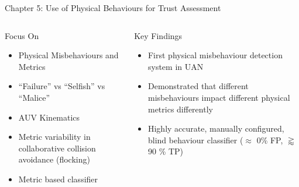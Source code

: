 \documentclass[aspectratio=43]{beamer}
\begin{document}
\begin{frame}{Chapter 5: Use of Physical Behaviours for Trust Assessment}
  \begin{columns}
    \begin{column}{0.5\textwidth}
      \begin{block}{Focus On}
        \begin{itemize}
          \item Physical Misbehaviours and Metrics
          \item ``Failure'' vs ``Selfish'' vs ``Malice''
          \item AUV Kinematics
          \item Metric variability in collaborative collision avoidance (flocking)
          \item Metric based classifier
        \end{itemize}
      \end{block}
    \end{column}
    \begin{column}{0.5\textwidth}
      \begin{exampleblock}{Key Findings}
        \begin{itemize}
        	\item First physical misbehaviour detection system in UAN
        	\item Demonstrated that different misbehaviours impact different physical metrics differently \hyperlink{fig:metric_values}{} \hyperlink{fig:summedsigmabar}{}
        	\item Highly accurate, manually configured, blind behaviour classifier ($\approx$ 0\% FP, $\gtrapprox$ 90 \% TP)
        \end{itemize}
      \end{exampleblock}
    \end{column}
  \end{columns}
\end{frame}
\end{document}
